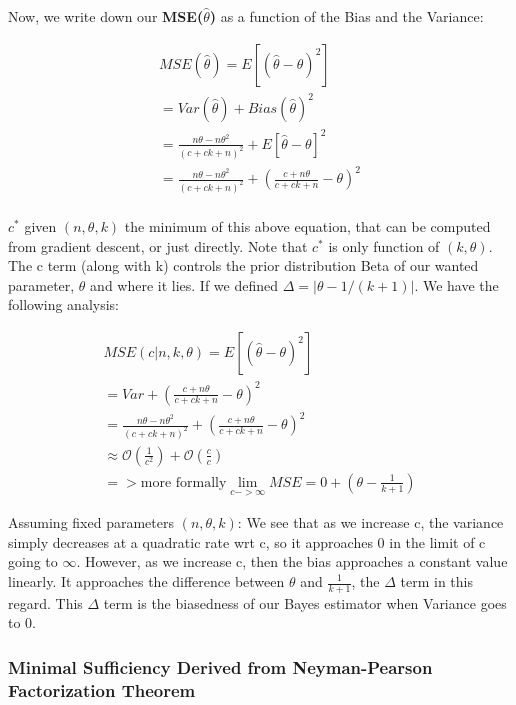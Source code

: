       Now, we write down our \textbf{MSE($\hat{\theta}$)} as a function of the Bias and the Variance:

      \begin{align*}
          MSE(\hat{\theta}) = E[(\hat{\theta} - \theta)^2] \\
            = Var(\hat{\theta}) + Bias(\hat{\theta})^2 \\
            = \frac{n\theta - n\theta^2}{(c + ck + n)^2} + E[\hat{\theta} - \theta]^2 \\
            = \frac{n\theta - n\theta^2}{(c + ck + n)^2} + (\frac{c+n\theta}{c + ck + n} - \theta)^2 \\
      \end{align*}

      $c^*$ given $(n, \theta, k)$ the minimum of this above equation, that can be computed from gradient descent, or just directly. Note that $c^*$ is only  function of $(k, \theta)$. The c term (along with k) controls the prior distribution Beta of our wanted parameter, $\theta$ and where it lies. If we defined $\Delta = |\theta - 1/(k+1)|$. We have the following analysis:

      \begin{align*}
        MSE(c | n, k, \theta) = E[(\hat{\theta} - \theta)^2] \\
          = Var + (\frac{c+n\theta}{c + ck + n} - \theta)^2 \\
          = \frac{n\theta - n\theta^2}{(c + ck + n)^2} + (\frac{c+n\theta}{c + ck + n} - \theta)^2 \\
          \approx \mathcal{O}(\frac{1}{c^2}) + \mathcal{O}(\frac{c}{c}) \\
          => \text{more formally} \lim_{c->\infty} MSE = 0 + (\theta - \frac{1}{k+1})
      \end{align*}

      Assuming fixed parameters $(n, \theta, k)$: We see that as we increase c, the variance simply decreases at a quadratic rate wrt c, so it approaches 0 in the limit of c going to $\infty$. However, as we increase c, then the bias approaches a constant value linearly. It approaches the difference between $\theta$ and $\frac{1}{k+1}$, the $\Delta$ term in this regard. This $\Delta$ term is the biasedness of our Bayes estimator when Variance goes to 0. 

		\subsubsection{Minimal Sufficiency Derived from Neyman-Pearson Factorization Theorem}
    
